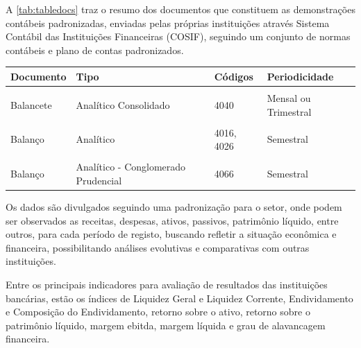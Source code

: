 \documentclass[12pt,12pt,openright,oneside,a4paper,chapter=TITLE,section=TITLE,subsection=TITLE,subsubsection=TITLE,english,french,spanish,portugues,sumario=tradicional]{abntex2}
\begin{document}
A \autoref{tab:tabledocs} traz o resumo dos documentos que constituem as demonstrações contábeis padronizadas, enviadas pelas próprias instituições através Sistema Contábil das Instituições Financeiras (COSIF), seguindo um conjunto de normas contábeis e plano de contas padronizados.

\begin{table}
\caption{Tabela indicativa das Demonstrações Contábeis Padronizadas}
\begin{table}[H]
\centering\begingroup\fontsize{10}{12}\selectfont

\begin{tabular}[t]{llll}
\toprule
Documento & Tipo & Códigos & Periodicidade\\
\midrule
\cellcolor{gray!6}{Balancete} & \cellcolor{gray!6}{Analítico} & \cellcolor{gray!6}{4010, 4020, 4413, 4433} & \cellcolor{gray!6}{Mensal ou Trimestral}\\
Balancete & Analítico Consolidado & 4040 & Mensal ou Trimestral\\
\cellcolor{gray!6}{Balancete} & \cellcolor{gray!6}{Analítico - Conglomerado Prudencial} & \cellcolor{gray!6}{4060} & \cellcolor{gray!6}{Mensal ou Trimestral}\\
Balanço & Analítico & 4016, 4026 & Semestral\\
\cellcolor{gray!6}{Balanço} & \cellcolor{gray!6}{Analítico Consolidado} & \cellcolor{gray!6}{4046} & \cellcolor{gray!6}{Semestral}\\
\addlinespace
Balanço & Analítico - Conglomerado Prudencial & 4066 & Semestral\\
\bottomrule
\end{tabular}
\endgroup{}
\end{table}
\label{tab:tabledocs}
\end{table}

Os dados são divulgados seguindo uma padronização para o setor, onde podem ser observados as receitas, despesas, ativos, passivos, patrimônio líquido, entre outros, para cada período de registo, buscando refletir a situação econômica e financeira, possibilitando análises evolutivas e comparativas com outras instituições.

Entre os principais indicadores para avaliação de resultados das instituições bancárias, estão os índices de Liquidez Geral e Liquidez Corrente, Endividamento e Composição do Endividamento, retorno sobre o ativo, retorno sobre o patrimônio líquido, margem ebitda, margem líquida e grau de alavancagem financeira.
\end{document}
